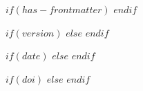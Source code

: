 $if(has-frontmatter)$
\frontmatter
$endif$


\newcommand{\guidelinetitle}{$title$}

$if(version)$
\newcommand{\guidelineversion}{$version$}
$else$
\newcommand{\guidelineversion}{}
$endif$

$if(date)$
\newcommand{\guidelinedate}{$date$}
$else$
\newcommand{\guidelinedate}{}
$endif$

$if(doi)$
\newcommand{\guidelinedoi}{$doi$}
$else$
\newcommand{\guidelinedoi}{}
$endif$




